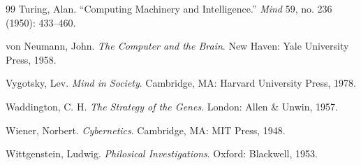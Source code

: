 \documentclass[12pt,openany]{book}
\theoremstyle{plain}
\theoremstyle{definition}
\theoremstyle{remark}
\begin{document}
\begin{thebibliography}{99}
Turing, Alan.
``Computing Machinery and Intelligence.''
\textit{Mind} 59, no. 236 (1950): 433--460.

von Neumann, John.
\textit{The Computer and the Brain}.
New Haven: Yale University Press, 1958.

Vygotsky, Lev.
\textit{Mind in Society}.
Cambridge, MA: Harvard University Press, 1978.

Waddington, C. H.
\textit{The Strategy of the Genes}.
London: Allen \& Unwin, 1957.

Wiener, Norbert.
\textit{Cybernetics}.
Cambridge, MA: MIT Press, 1948.

Wittgenstein, Ludwig.
\textit{Philosical Investigations}.
Oxford: Blackwell, 1953.

\end{thebibliography}
\end{document}
